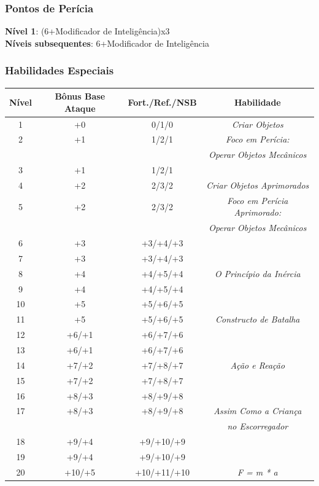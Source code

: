 \documentclass[ letterpaper,12pt]{article}
\begin{document}
\subsubsection{Pontos de Perícia}
{\bf Nível 1}: (6+Modificador de Inteligência)x3\\
{\bf Níveis subsequentes}: 6+Modificador de Inteligência\\

\subsubsection{Habilidades Especiais}
\begin{center} \begin{tabular}{|c||c|c|c|}
\hline
{\bf Nível}&{\bf Bônus Base Ataque}&{\bf Fort./Ref./NSB}&{\bf Habilidade}\\
\hline
1&+0&0/1/0&{\it Criar Objetos }\\
\hline
2&+1&1/2/1&{\it Foco em Perícia:}\\
 & & & {\it Operar Objetos Mecânicos}\\
\hline
3&+1&1/2/1&\\
\hline
4&+2&2/3/2&{\it Criar Objetos Aprimorados}\\
\hline
5&+2&2/3/2&{\it Foco em Perícia Aprimorado:}\\
&&&{\it Operar Objetos Mecânicos}\\
\hline
6&+3&+3/+4/+3&\\
\hline
7&+3&+3/+4/+3&\\
\hline
8&+4&+4/+5/+4&{\it O Princípio da Inércia}\\
\hline
9&+4&+4/+5/+4&\\
\hline
10&+5&+5/+6/+5&\\
\hline
11&+5&+5/+6/+5&{\it Constructo de Batalha}\\
\hline
12&+6/+1&+6/+7/+6&\\
\hline
13&+6/+1&+6/+7/+6&\\
\hline
14&+7/+2&+7/+8/+7&{\it Ação e Reação}\\
\hline
15&+7/+2&+7/+8/+7&\\
\hline
16&+8/+3&+8/+9/+8&\\
\hline
17&+8/+3&+8/+9/+8&{\it Assim Como a Criança}\\
  &  &  &{\it no Escorregador}\\
\hline
18&+9/+4&+9/+10/+9&\\
\hline
19&+9/+4&+9/+10/+9&\\
\hline
20&+10/+5&+10/+11/+10&{\it F = m * a}\\
\hline
\end{tabular} \end{center}
\end{document}
